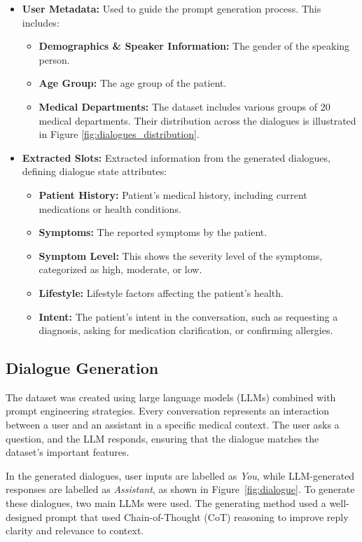\documentclass[manuscript,screen,review]{acmart}
\begin{document}
\begin{itemize}
    \item \textbf{User Metadata:} Used to guide the prompt generation process. This includes:
    \begin{itemize}
        \item \textbf{Demographics \& Speaker Information:} The gender of the speaking person.
        \item \textbf{Age Group:} The age group of the patient.
        \item \textbf{Medical Departments:} The dataset includes various groups of 20 medical departments. Their distribution across the dialogues is illustrated in Figure \ref{fig:dialogues_distribution}.
    \end{itemize}

    \item \textbf{Extracted Slots:} Extracted information from the generated dialogues, defining dialogue state attributes:
    \begin{itemize}
        \item \textbf{Patient History:} Patient's medical history, including current medications or health conditions. 
        \item \textbf{Symptoms:} The reported symptoms by the patient.
        \item \textbf{Symptom Level:} This shows the severity level of the symptoms, categorized as high, moderate, or low.
        \item \textbf{Lifestyle:} Lifestyle factors affecting the patient's health.  
        \item \textbf{Intent:} The patient's intent in the conversation, such as requesting a diagnosis, asking for medication clarification, or confirming allergies.
    \end{itemize}
\end{itemize}

\subsection{Dialogue Generation}
The dataset was created using large language models (LLMs) combined with prompt engineering strategies.  Every conversation represents an interaction between a user and an assistant in a specific medical context. The user asks a question, and the LLM responds, ensuring that the dialogue matches the dataset's important features.

In the generated dialogues, user inputs are labelled as \textit{You}, while LLM-generated responses are labelled as \textit{Assistant}, as shown in Figure~\ref{fig:dialogue}. To generate these dialogues, two main LLMs were used. The generating method used a well-designed prompt that used Chain-of-Thought (CoT) reasoning to improve reply clarity and relevance to context.
\end{document}
